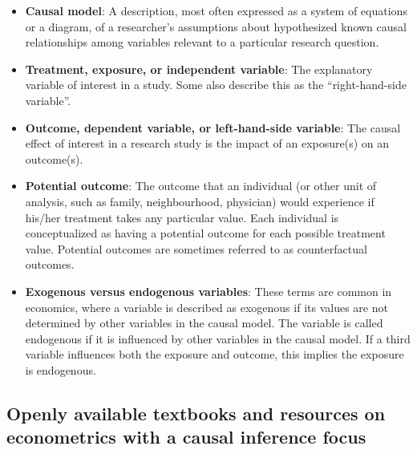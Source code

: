\documentclass[
]{book}
\providecommand{\tightlist}{%
  \setlength{\itemsep}{0pt}\setlength{\parskip}{0pt}}
\begin{document}
\begin{itemize}
\tightlist
\item
  \textbf{Causal model}: A description, most often expressed as a system
  of equations or a diagram, of a researcher's assumptions about
  hypothesized known causal relationships among variables relevant to a
  particular research question.
\item
  \textbf{Treatment, exposure, or independent variable}: The explanatory
  variable of interest in a study. Some also describe this as the
  ``right-hand-side variable''.
\item
  \textbf{Outcome, dependent variable, or left-hand-side variable}: The
  causal effect of interest in a research study is the impact of an
  exposure(s) on an outcome(s).
\item
  \textbf{Potential outcome}: The outcome that an individual (or other
  unit of analysis, such as family, neighbourhood, physician) would
  experience if his/her treatment takes any particular value. Each
  individual is conceptualized as having a potential outcome for each
  possible treatment value. Potential outcomes are sometimes referred to
  as counterfactual outcomes.
\item
  \textbf{Exogenous versus endogenous variables}: These terms are common
  in economics, where a variable is described as exogenous if its values
  are not determined by other variables in the causal model. The
  variable is called endogenous if it is influenced by other variables
  in the causal model. If a third variable influences both the exposure
  and outcome, this implies the exposure is endogenous.
\end{itemize}

\hypertarget{openly-available-textbooks-and-resources-on-econometrics-with-a-causal-inference-focus}{%
\subsection{Openly available textbooks and resources on econometrics
with a causal inference
focus}\label{openly-available-textbooks-and-resources-on-econometrics-with-a-causal-inference-focus}}
\end{document}
